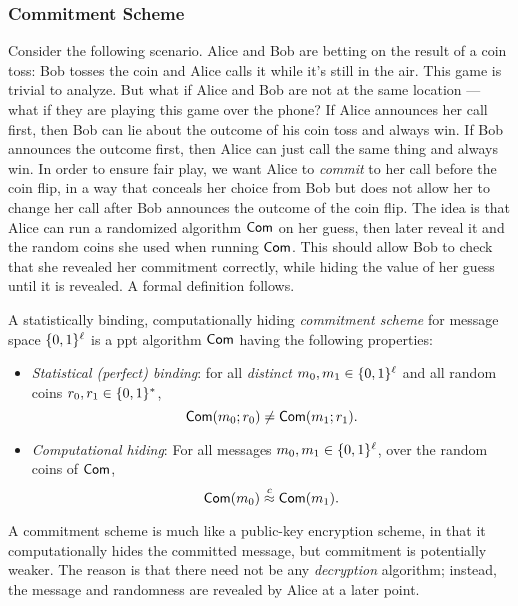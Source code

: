 \documentclass[11pt]{article}
\begin{document}
\subsubsection{Commitment Scheme}
\label{sec:commitment-scheme}

\newcommand{\Com}{\algo{Com}}

Consider the following scenario.  Alice and Bob are betting on the
result of a coin toss: Bob tosses the coin and Alice calls it while
it's still in the air.  This game is trivial to analyze.  But what if
Alice and Bob are not at the same location --- what if they are
playing this game over the phone?  If Alice announces her call first,
then Bob can lie about the outcome of his coin toss and always win.
If Bob announces the outcome first, then Alice can just call the same
thing and always win.  In order to ensure fair play, we want Alice to
\emph{commit} to her call before the coin flip, in a way that conceals
her choice from Bob but does not allow her to change her call after
Bob announces the outcome of the coin flip.  The idea is that Alice
can run a randomized algorithm $\Com$ on her guess, then later reveal
it and the random coins she used when running $\Com$.  This should
allow Bob to check that she revealed her commitment correctly, while
hiding the value of her guess until it is revealed.  A formal
definition follows.

\begin{definition}
  A statistically binding, computationally hiding \emph{commitment
    scheme} for message space $\{0,1\}^{\ell}$ is a ppt algorithm $\Com$
  having the following properties:
  \begin{itemize}
  \item \emph{Statistical (perfect) binding}: for all \emph{distinct}
    $m_0, m_1 \in \{0,1\}^{\ell}$ and all random coins $r_0, r_1 \in
    \{0,1\}^{*}$, \[ \Com(m_0; r_0) \neq \Com(m_1; r_1). \]
   
  \item \emph{Computational hiding}: For all messages $m_0, m_1 \in
    \{0,1\}^{\ell}$, over the random coins of $\Com$, \[ \Com(m_{0})
    \compind \Com(m_{1}). \]
  \end{itemize}
\end{definition}

\begin{remark}
  \label{rem:com-enc}
  A commitment scheme is much like a public-key encryption scheme, in
  that it computationally hides the committed message, but commitment
  is potentially weaker.  The reason is that there need not be any
  \emph{decryption} algorithm; instead, the message and randomness are
  revealed by Alice at a later point.
\end{remark}
\end{document}
